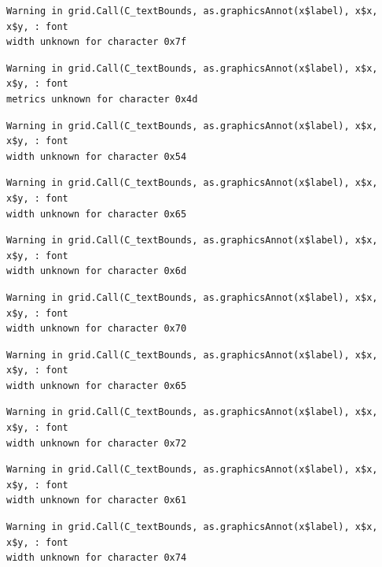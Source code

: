 \documentclass[
  letterpaper,
]{scrbook}
\begin{document}
\begin{verbatim}
Warning in grid.Call(C_textBounds, as.graphicsAnnot(x$label), x$x, x$y, : font
width unknown for character 0x7f
\end{verbatim}

\begin{verbatim}
Warning in grid.Call(C_textBounds, as.graphicsAnnot(x$label), x$x, x$y, : font
metrics unknown for character 0x4d
\end{verbatim}

\begin{verbatim}
Warning in grid.Call(C_textBounds, as.graphicsAnnot(x$label), x$x, x$y, : font
width unknown for character 0x54
\end{verbatim}

\begin{verbatim}
Warning in grid.Call(C_textBounds, as.graphicsAnnot(x$label), x$x, x$y, : font
width unknown for character 0x65
\end{verbatim}

\begin{verbatim}
Warning in grid.Call(C_textBounds, as.graphicsAnnot(x$label), x$x, x$y, : font
width unknown for character 0x6d
\end{verbatim}

\begin{verbatim}
Warning in grid.Call(C_textBounds, as.graphicsAnnot(x$label), x$x, x$y, : font
width unknown for character 0x70
\end{verbatim}

\begin{verbatim}
Warning in grid.Call(C_textBounds, as.graphicsAnnot(x$label), x$x, x$y, : font
width unknown for character 0x65
\end{verbatim}

\begin{verbatim}
Warning in grid.Call(C_textBounds, as.graphicsAnnot(x$label), x$x, x$y, : font
width unknown for character 0x72
\end{verbatim}

\begin{verbatim}
Warning in grid.Call(C_textBounds, as.graphicsAnnot(x$label), x$x, x$y, : font
width unknown for character 0x61
\end{verbatim}

\begin{verbatim}
Warning in grid.Call(C_textBounds, as.graphicsAnnot(x$label), x$x, x$y, : font
width unknown for character 0x74
\end{verbatim}
\end{document}
